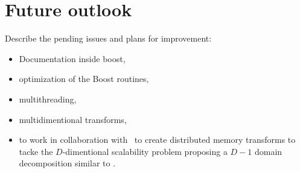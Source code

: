 \section{Future outlook}
Describe the pending issues and plans for improvement:
\begin{itemize}
    \item Documentation inside boost,
    \item optimization of the Boost routines,
    \item multithreading,
    \item multidimentional transforms,
    \item to work in collaboration with \boostmpi\ to create distributed memory
    transforms to tacke the $D$-dimentional scalability problem proposing a
    $D-1$ domain decomposition similar to \cite{pippig_13}.
\end{itemize}

